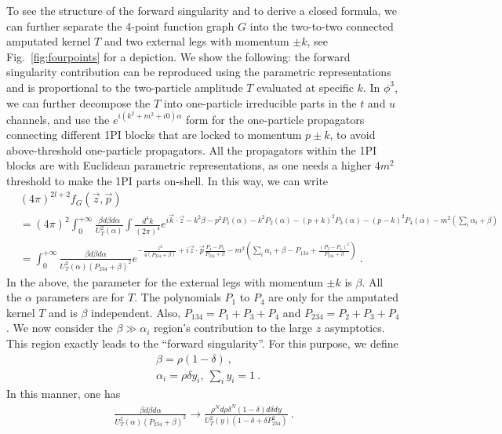 \documentclass[a4paper,11pt]{article}
\begin{document}
To see the structure of the forward singularity and to derive a closed formula, we can further separate the 4-point function graph $G$ into the two-to-two connected amputated kernel $T$ and two external legs with momentum $\pm k$, see Fig.~\ref{fig:fourpoints} for a depiction. We show the following: the forward singularity contribution can be reproduced using the parametric representations and is proportional to the two-particle amplitude $T$ evaluated at specific $k$. In $\phi^3$, we can further decompose the $T$ into one-particle irreducible parts in the $t$ and $u$ channels, and use the $e^{i(k^2+m^2+i0)\alpha}$ form for the one-particle propagators connecting different 1PI blocks that are locked to momentum $p\pm k$, to avoid above-threshold one-particle propagators. All the propagators within the 1PI blocks are with Euclidean parametric representations, as one needs a higher $4m^2$ threshold to make the 1PI parts on-shell. In this way, we can write 
\begin{align}
&(4\pi)^{2l+2}f_G(\vec{z},\vec{p})\nonumber \\
&=(4\pi)^2 \int_0^{+\infty} \frac{\beta d\beta d\alpha}{U_T^2(\alpha)} \int \frac{d^4 k}{(2\pi)^4} e^{i \vec{k}\cdot \vec{z} - k^2 \beta - p^2 P_1(\alpha) - k^2 P_2(\alpha) - (p+k)^2 P_3(\alpha) - (p-k)^2 P_4(\alpha) - m^2 (\sum_i \alpha_i + \beta) } \nonumber \\
&=\int_{0}^{+\infty}\frac{\beta d\beta d\alpha}{U_T^2(\alpha)(P_{234}+\beta)^2}e^{-\frac{z^2}{4(P_{234}+\beta)}+i\vec{z}\cdot\vec{p} \frac{P_4-P_3}{P_{234}+\beta}-m^2\left(\sum_i\alpha_i+\beta-P_{134}+\frac{(P_3-P_4)^2}{P_{234}+\beta}\right)} \ . 
\end{align}
In the above, the parameter for the external legs with momentum $\pm k$ is $\beta$. All the $\alpha$ parameters are for $T$. The polynomials $P_1$ to $P_4$ are only for the amputated kernel $T$ and is $\beta$ independent. Also, $P_{134}=P_1+P_3+P_4$ and $P_{234}=P_2+P_3+P_4$. We now consider the $\beta\gg \alpha_i$ region's contribution to the large $z$ asymptotics. This region exactly leads to the ``forward singularity''. For this purpose, we define 
\begin{align}
&\beta=\rho (1-\delta) \ , \\
&\alpha_i=\rho \delta y_i, \  \sum_iy_i=1 \ . 
\end{align}
In this manner, one has
\begin{align}
\frac{ \beta d\beta d\alpha} {U_T^2(\alpha)(P_{234}+\beta)^2} \rightarrow \frac{\rho^Nd\rho \delta^N(1-\delta)d\delta dy}{U_T^2(y)(1-\delta+\delta P_{234}^2)} \ . 
\end{align}
\end{document}
